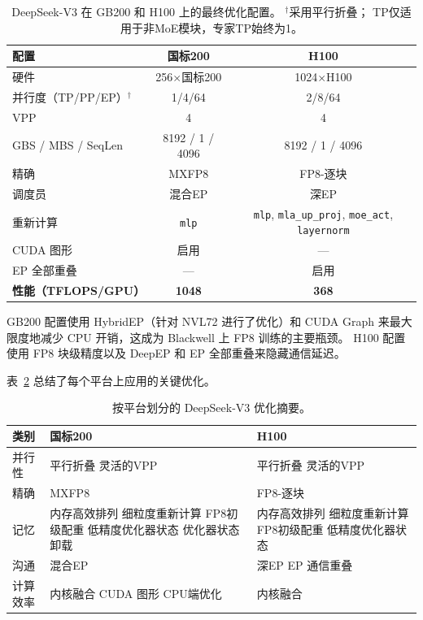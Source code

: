 \begin{table}[ht]
\centering
\caption{DeepSeek-V3 在 GB200 和 H100 上的最终优化配置。 $^\dagger$采用平行折叠； TP仅适用于非MoE模块，专家TP始终为1。}
\label{tab:deepseekv3-config}
\begin{tabular}{lcc}
\toprule
\textbf{配置} & \textbf{国标200} & \textbf{H100} \\
\midrule
硬件 & 256$\times$国标200 & 1024$\times$H100 \\
并行度（TP/PP/EP）$^\dagger$ & 1/4/64 & 2/8/64 \\
VPP & 4 & 4 \\
GBS / MBS / SeqLen & 8192 / 1 / 4096 & 8192 / 1 / 4096 \\
精确 & MXFP8 & FP8-逐块 \\
调度员 & 混合EP & 深EP \\
重新计算 & \texttt{mlp} & \texttt{mlp}, \texttt{mla\_up\_proj}, \texttt{moe\_act}, \texttt{layernorm} \\
CUDA 图形 & 启用 & --- \\
EP 全部重叠 & --- & 启用 \\
\midrule
\textbf{性能（TFLOPS/GPU）} & \textbf{1048} & \textbf{368} \\
\bottomrule
\end{tabular}
\end{table}

GB200 配置使用 HybridEP（针对 NVL72 进行了优化）和 CUDA Graph 来最大限度地减少 CPU 开销，这成为 Blackwell 上 FP8 训练的主要瓶颈。 H100 配置使用 FP8 块级精度以及 DeepEP 和 EP 全部重叠来隐藏通信延迟。

表~\ref{tab:deepseekv3-journey} 总结了每个平台上应用的关键优化。

\begin{table}[ht]
\centering
\caption{按平台划分的 DeepSeek-V3 优化摘要。}
\label{tab:deepseekv3-journey}
\begin{tabular}{lp{5cm}p{5cm}}
\toprule
\textbf{类别} & \textbf{国标200} & \textbf{H100} \\
\midrule
并行性 & 平行折叠 \newline 灵活的VPP & 平行折叠 \newline 灵活的VPP \\
\midrule
精确 & MXFP8 & FP8-逐块 \\
\midrule
记忆 & 内存高效排列 \newline 细粒度重新计算 \newline FP8初级配重 \newline 低精度优化器状态 \newline 优化器状态卸载 & 内存高效排列 \newline 细粒度重新计算 \newline FP8初级配重 \newline 低精度优化器状态 \\
\midrule
沟通 & 混合EP & 深EP \newline EP 通信重叠 \\
\midrule
计算效率 & 内核融合 \newline CUDA 图形 \newline CPU端优化 & 内核融合 \\
\bottomrule
\end{tabular}
\end{table}

